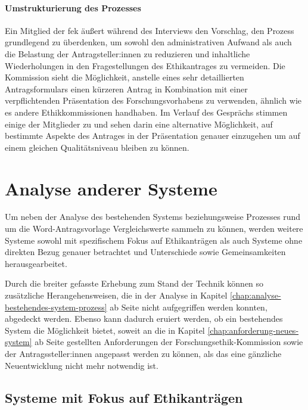 \documentclass[a4paper,12pt,twoside]{scrreprt}
\begin{document}
\subsubsection*{Umstrukturierung des Prozesses}
\label{sub-sub-sec:umstrukturierung-prozess}

Ein Mitglied der \ac{fek} äußert während des Interviews den Vorschlag, den Prozess grundlegend zu überdenken, um sowohl den administrativen Aufwand als auch die Belastung der Antragsteller:innen zu reduzieren und inhaltliche Wiederholungen in den Fragestellungen des Ethikantrages zu vermeiden. Die Kommission sieht die Möglichkeit, anstelle eines sehr detaillierten Antragsformulars einen kürzeren Antrag in Kombination mit einer verpflichtenden Präsentation des Forschungsvorhabens zu verwenden, ähnlich wie es andere Ethikkommissionen handhaben. Im Verlauf des Gesprächs stimmen einige der Mitglieder zu und sehen darin eine alternative Möglichkeit, auf bestimmte Aspekte des Antrages in der Präsentation genauer einzugehen um auf einem gleichen Qualitätsniveau bleiben zu können.

\chapter{Analyse anderer Systeme}
\label{chap:analyse-anderer-systeme}

Um neben der Analyse des bestehenden Systems beziehungsweise Prozesses rund um die Word-Antragsvorlage Vergleichswerte sammeln zu können, werden weitere Systeme sowohl mit spezifischem Fokus auf Ethikanträgen als auch Systeme ohne direkten Bezug genauer betrachtet und Unterschiede sowie Gemeinsamkeiten herausgearbeitet.

Durch die breiter gefasste Erhebung zum Stand der Technik können so zusätzliche Herangehensweisen, die in der Analyse in Kapitel \ref{chap:analyse-bestehendes-system-prozess} ab Seite \pageref{chap:analyse-anderer-systeme} nicht aufgegriffen werden konnten, abgedeckt werden. Ebenso kann dadurch eruiert werden, ob ein bestehendes System die Möglichkeit bietet, soweit an die in Kapitel \ref{chap:anforderung-neues-system} ab Seite \pageref{chap:anforderung-neues-system} gestellten Anforderungen der Forschungsethik-Kommission sowie der Antragssteller:innen angepasst werden zu können, als das eine gänzliche Neuentwicklung nicht mehr notwendig ist.

\section{Systeme mit Fokus auf Ethikanträgen}
\label{sec:systeme-mit-fokkus-ethikantrage}
\end{document}
